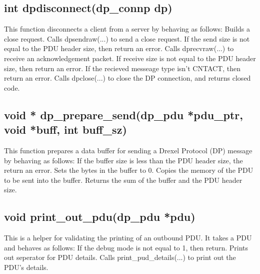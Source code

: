 \documentclass[12pt, a4paper]{article}
\begin{document}
{\subsection{int dpdisconnect(dp\_connp dp)}
This function disconnects a client from a server by behaving as follows: \newline
\indent Builds a close request. \newline
\indent Calls dpsendraw(...) to send a close request. If the send size is not \newline
\indent\indent equal to the PDU header size, then return an error. \newline
\indent Calls dprecvraw(...) to receive an acknowledgement packet. If receive \newline
\indent\indent size is not equal to the PDU header size, then return an error. \newline
\indent\indent If the recieved messeage type isn't CNTACT, then return an error. \newline
\indent Calls dpclose(...) to close the DP connection, and returns closed code.

\subsection{void * dp\_prepare\_send(dp\_pdu *pdu\_ptr, void *buff, int buff\_sz)}
This function prepares a data buffer for sending a Drexel Protocol (DP) message by behaving as follows: \newline
\indent If the buffer size is less than the PDU header size, the return an error. \newline
\indent Sets the bytes in the buffer to 0. \newline
\indent Copies the memory of the PDU to be sent into the buffer. \newline
\indent Returns the sum of the buffer and the PDU header size.

\subsection{void print\_out\_pdu(dp\_pdu *pdu)}
This is a helper for validating the printing of an outbound PDU. It takes a PDU and behaves as follows: \newline
\indent If the debug mode is not equal to 1, then return. \newline
\indent Prints out seperator for PDU details. \newline
\indent Calls print\_pud\_details(...) to print out the PDU's details.

}
\end{document}
